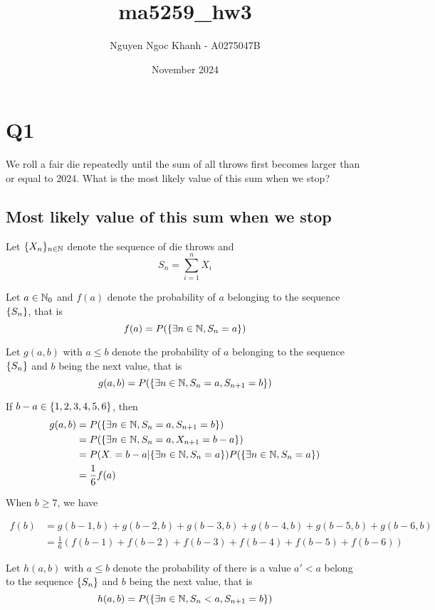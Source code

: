 \documentclass{article}
\title{ma5259\_hw3}
\author{Nguyen Ngoc Khanh - A0275047B}
\date{November 2024}
\begin{document}
\maketitle

\section{Q1}
We roll a fair die repeatedly until the sum of all throws first becomes larger than or equal to 2024. What is the most likely value of this sum when we stop?

\subsection{Most likely value of this sum when we stop}

Let $\{X_n\}_{n \in \mathbb{N}}$ denote the sequence of die throws and 
$$
    S_n = \sum_{i=1}^n X_i
$$

Let $a \in \mathbb{N}_0$ and $f(a)$ denote the probability of $a$ belonging to the sequence $\{S_n\}$, that is
$$
    f(a) = P(\{\exists n \in \mathbb{N}, S_n = a\})
$$

Let $g(a, b)$ with $a \leq b$ denote the probability of $a$ belonging to the sequence $\{S_n\}$ and $b$ being the next value, that is
$$
    g(a, b) = P(\{\exists n \in \mathbb{N}, S_n = a, S_{n+1} = b\} )
$$

If $b - a \in \{1, 2, 3, 4, 5, 6\}$, then 
\begin{align*}
    g(a, b)
    &= P(\{\exists n \in \mathbb{N}, S_n = a, S_{n+1} = b\} ) \\
    &= P(\{\exists n \in \mathbb{N}, S_n = a, X_{n+1} = b-a\} ) \\
    &= P(X_\cdot = b-a | \{\exists n \in \mathbb{N}, S_n = a\}) P(\{\exists n \in \mathbb{N}, S_n = a\}) \\
    &= \frac{1}{6} f(a)
\end{align*}

When $b \geq 7$, we have

\begin{align*}
    f(b)
    &= g(b-1, b) + g(b-2, b) + g(b-3, b) + g(b-4, b) + g(b-5, b) + g(b-6, b) \\
    &= \frac{1}{6} (f(b-1) + f(b-2) + f(b-3) + f(b-4) + f(b-5) + f(b-6))
\end{align*}

Let $h(a, b)$ with $a \leq b$ denote the probability of there is a value $a' < a$ belong to the sequence $\{S_n\}$ and $b$ being the next value, that is
$$
    h(a, b) = P(\{\exists n \in \mathbb{N}, S_n < a, S_{n+1} = b\})
$$
\end{document}
